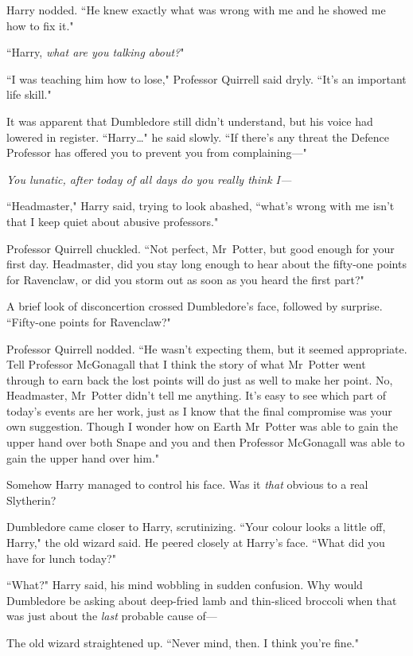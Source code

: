 Harry nodded. ``He knew exactly what was wrong with me and he showed me how to fix it."

``Harry, \emph{what are you talking about?}"

``I was teaching him how to lose," Professor Quirrell said dryly. ``It's an important life skill."

It was apparent that Dumbledore still didn't understand, but his voice had lowered in register. ``Harry{\ldots}" he said slowly. ``If there's any threat the Defence Professor has offered you to prevent you from complaining—"

\emph{You lunatic, after today of all days do you really think I—}

``Headmaster," Harry said, trying to look abashed, ``what's wrong with me isn't that I keep quiet about abusive professors."

Professor Quirrell chuckled. ``Not perfect, Mr~Potter, but good enough for your first day. Headmaster, did you stay long enough to hear about the fifty-one points for Ravenclaw, or did you storm out as soon as you heard the first part?"

A brief look of disconcertion crossed Dumbledore's face, followed by surprise. ``Fifty-one points for Ravenclaw?"

Professor Quirrell nodded. ``He wasn't expecting them, but it seemed appropriate. Tell Professor McGonagall that I think the story of what Mr~Potter went through to earn back the lost points will do just as well to make her point. No, Headmaster, Mr~Potter didn't tell me anything. It's easy to see which part of today's events are her work, just as I know that the final compromise was your own suggestion. Though I wonder how on Earth Mr~Potter was able to gain the upper hand over both Snape and you and then Professor McGonagall was able to gain the upper hand over him."

Somehow Harry managed to control his face. Was it \emph{that} obvious to a real Slytherin?

Dumbledore came closer to Harry, scrutinizing. ``Your colour looks a little off, Harry," the old wizard said. He peered closely at Harry's face. ``What did you have for lunch today?"

``What?" Harry said, his mind wobbling in sudden confusion. Why would Dumbledore be asking about deep-fried lamb and thin-sliced broccoli when that was just about the \emph{last} probable cause of—

The old wizard straightened up. ``Never mind, then. I think you're fine."

